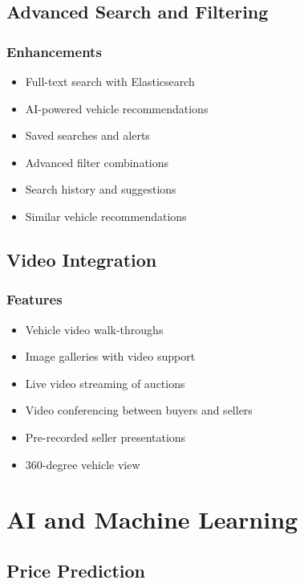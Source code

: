 \subsection{Advanced Search and Filtering}

\subsubsection{Enhancements}
\begin{itemize}
    \item Full-text search with Elasticsearch
    \item AI-powered vehicle recommendations
    \item Saved searches and alerts
    \item Advanced filter combinations
    \item Search history and suggestions
    \item Similar vehicle recommendations
\end{itemize}

\subsection{Video Integration}

\subsubsection{Features}
\begin{itemize}
    \item Vehicle video walk-throughs
    \item Image galleries with video support
    \item Live video streaming of auctions
    \item Video conferencing between buyers and sellers
    \item Pre-recorded seller presentations
    \item 360-degree vehicle view
\end{itemize}

\section{AI and Machine Learning}

\subsection{Price Prediction}

